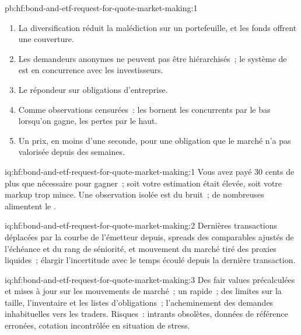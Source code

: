 \begin{solution}{pb:hf:bond-and-etf-request-for-quote-market-making:1}
\begin{enumerate}
\item La diversification réduit la malédiction sur un portefeuille, et les fonds offrent une couverture.
\item Les demandeurs anonymes ne peuvent pas être hiérarchisés~; le système de  est en concurrence avec les investisseurs.
\item Le répondeur sur obligations d'entreprise.
\item Comme observations censurées~: les  bornent les concurrents par le bas lorsqu'on gagne, les pertes par le haut.
\item Un prix, en moins d'une seconde, pour une obligation que le marché n'a pas valorisée depuis des semaines.
\end{enumerate}
\end{solution}

\begin{solution}{iq:hf:bond-and-etf-request-for-quote-market-making:1}
Vous avez payé 30 cents de plus que nécessaire pour gagner~; soit votre estimation était élevée, soit votre markup trop mince. Une observation isolée est du bruit~; de nombreuses alimentent le
.
\end{solution}

\begin{solution}{iq:hf:bond-and-etf-request-for-quote-market-making:2}
Dernières transactions déplacées par la courbe de l'émetteur depuis, spreads des comparables ajustés de l'échéance et du rang de séniorité, et mouvement du marché tiré des proxies liquides~; élargir
l'incertitude avec le temps écoulé depuis la dernière transaction.
\end{solution}

\begin{solution}{iq:hf:bond-and-etf-request-for-quote-market-making:3}
Des fair values précalculées et mises à jour sur les mouvements de marché~; un  rapide~; des limites sur la taille, l'inventaire et les listes d'obligations~; l'acheminement des demandes inhabituelles vers les traders.
Risques~: intrants obsolètes, données de référence erronées, cotation incontrôlée en situation de stress.
\end{solution}

